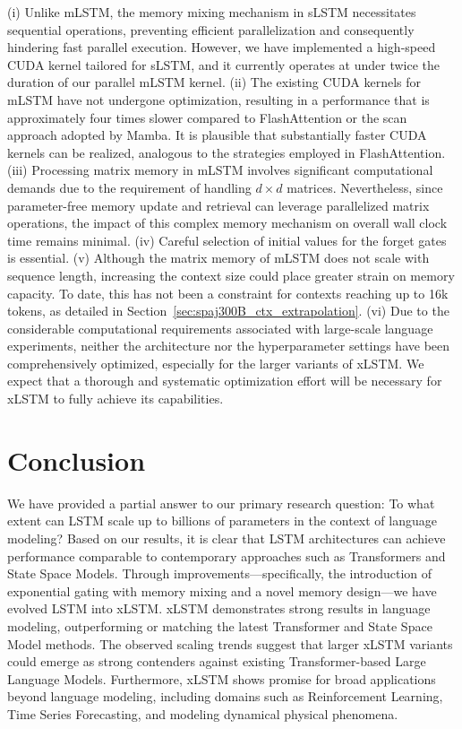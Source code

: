 (i) Unlike mLSTM, the memory mixing mechanism in sLSTM necessitates sequential operations, preventing efficient parallelization and consequently hindering fast parallel execution. However, we have implemented a high-speed CUDA kernel tailored for sLSTM, and it currently operates at under twice the duration of our parallel mLSTM kernel. (ii) The existing CUDA kernels for mLSTM have not undergone optimization, resulting in a performance that is approximately four times slower compared to FlashAttention or the scan approach adopted by Mamba. It is plausible that substantially faster CUDA kernels can be realized, analogous to the strategies employed in FlashAttention. (iii) Processing matrix memory in mLSTM involves significant computational demands due to the requirement of handling $d \times d$ matrices. Nevertheless, since parameter-free memory update and retrieval can leverage parallelized matrix operations, the impact of this complex memory mechanism on overall wall clock time remains minimal. (iv) Careful selection of initial values for the forget gates is essential. (v) Although the matrix memory of mLSTM does not scale with sequence length, increasing the context size could place greater strain on memory capacity. To date, this has not been a constraint for contexts reaching up to 16k tokens, as detailed in Section~\ref{sec:spaj300B_ctx_extrapolation}. (vi) Due to the considerable computational requirements associated with large-scale language experiments, neither the architecture nor the hyperparameter settings have been comprehensively optimized, especially for the larger variants of xLSTM. We expect that a thorough and systematic optimization effort will be necessary for xLSTM to fully achieve its capabilities.

\section{Conclusion}
We have provided a partial answer to our primary research question: To what extent can LSTM scale up to billions of parameters in the context of language modeling? Based on our results, it is clear that LSTM architectures can achieve performance comparable to contemporary approaches such as Transformers and State Space Models. Through improvements—specifically, the introduction of exponential gating with memory mixing and a novel memory design—we have evolved LSTM into xLSTM. xLSTM demonstrates strong results in language modeling, outperforming or matching the latest Transformer and State Space Model methods. The observed scaling trends suggest that larger xLSTM variants could emerge as strong contenders against existing Transformer-based Large Language Models. Furthermore, xLSTM shows promise for broad applications beyond language modeling, including domains such as Reinforcement Learning, Time Series Forecasting, and modeling dynamical physical phenomena.

